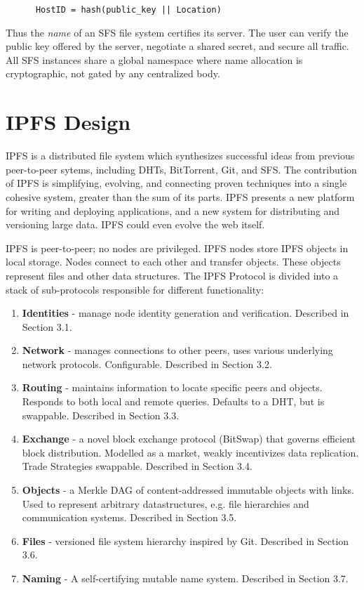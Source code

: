\documentclass{sig-alternate}
\begin{document}
\begin{verbatim}
      HostID = hash(public_key || Location)
\end{verbatim}

Thus the \textit{name} of an SFS file system certifies its server. The user can verify the public key offered by the server, negotiate a shared secret, and secure all traffic. All SFS instances share a global namespace where name allocation is cryptographic, not gated by any centralized body.

\section{IPFS Design}

IPFS is a distributed file system which synthesizes successful ideas from previous peer-to-peer sytems, including DHTs, BitTorrent, Git, and SFS. The contribution of IPFS is simplifying, evolving, and connecting proven techniques into a single cohesive system, greater than the sum of its parts. IPFS presents a new platform for writing and deploying applications, and a new system for distributing and versioning large data. IPFS could even evolve the web itself.

IPFS is peer-to-peer; no nodes are privileged. IPFS nodes store IPFS objects in local storage. Nodes connect to each other and transfer objects. These objects represent files and other data structures. The IPFS Protocol is divided into a stack of sub-protocols responsible for different functionality:

\begin{enumerate}
  \item \textbf{Identities} - manage node identity generation and verification. Described in Section 3.1.

  \item \textbf{Network} - manages connections to other peers, uses various underlying network protocols. Configurable. Described in Section 3.2.

  \item \textbf{Routing} - maintains information to locate specific peers and objects. Responds to both local and remote queries. Defaults to a DHT, but is swappable. Described in Section 3.3.

  \item \textbf{Exchange} - a novel block exchange protocol (BitSwap) that governs efficient block distribution. Modelled as a market, weakly incentivizes data replication. Trade Strategies swappable. Described in Section 3.4.

  \item \textbf{Objects} - a Merkle DAG of content-addressed immutable objects with links. Used to represent arbitrary datastructures, e.g. file hierarchies and communication systems. Described in Section 3.5.

  \item \textbf{Files} - versioned file system hierarchy inspired by Git. Described in Section 3.6.

  \item \textbf{Naming} - A self-certifying mutable name system. Described in Section 3.7.
\end{enumerate}
\end{document}
